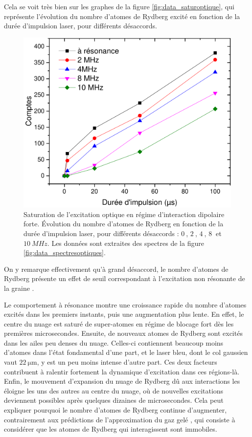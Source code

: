 Cela se voit très bien sur les graphes de la figure \eqref{fig:data_saturoptique}, qui représente l'évolution du nombre d'atomes de Rydberg excité en fonction de la durée d'impulsion laser, pour différents désaccords.
%
\begin{figure}[!h]
\centering
\includegraphics[width=.7\linewidth]{figures/low_l/satur_spectres_optiques_extract}
\caption[Saturation de l'excitation optique en régime d'interaction dipolaire forte]{Saturation de l'excitation optique en régime d'interaction dipolaire forte.
Évolution du nombre d'atomes de Rydberg en fonction de la durée d'impulsion laser, pour différents désaccords : $\SI{0}{}$, $\SI{2}{}$, $\SI{4}{}$, $\SI{8}{}$ et $\SI{10}{MHz}$.
Les données sont extraites des spectres de la figure \eqref{fig:data_spectresoptiques}.
}
\label{fig:data_saturoptique}
\end{figure}
%
On y remarque effectivement qu'à grand désaccord, le nombre d'atomes de Rydberg présente un effet de seuil correspondant à l'excitation non résonante de la \og graine \fg{}.

Le comportement à résonance montre une croissance rapide du nombre d'atomes excités dans les premiers instants, puis une augmentation plus lente.
En effet, le centre du nuage est saturé de super-atomes en régime de blocage fort dès les premières microsecondes.
Ensuite, de nouveaux atomes de Rydberg sont excités dans les ailes peu denses du nuage.
Celles-ci contiennent beaucoup moins d'atomes dans l'état fondamental d'une part, et le laser bleu, dont le col gaussien vaut $\SI{22}{\um}$, y est un peu moins intense d'autre part.
Ces deux facteurs contribuent à ralentir fortement la dynamique d'excitation dans ces régions-là.
Enfin, le mouvement d'expansion du nuage de Rydberg dû aux interactions les éloigne les uns des autres au centre du nuage, où de nouvelles excitations deviennent possibles après quelques dizaines de microsecondes.
Cela peut expliquer pourquoi le nombre d'atomes de Rydberg continue d'augmenter, contrairement aux prédictions de l'approximation du \og gaz gelé \fg{}, qui consiste à considérer que les atomes de Rydberg qui interagissent sont immobiles.%

